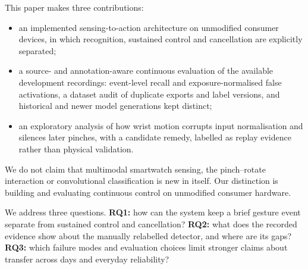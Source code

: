 This paper makes three contributions:
\begin{itemize}
\item an implemented sensing-to-action architecture on unmodified consumer devices, in which recognition, sustained control and cancellation are explicitly separated;
\item a source- and annotation-aware continuous evaluation of the available development recordings: event-level recall and exposure-normalised false activations, a dataset audit of duplicate exports and label versions, and historical and newer model generations kept distinct;
\item an exploratory analysis of how wrist motion corrupts input normalisation and silences later pinches, with a candidate remedy, labelled as replay evidence rather than physical validation.
\end{itemize}
We do not claim that multimodal smartwatch sensing, the pinch--rotate interaction or convolutional classification is new in itself. Our distinction is building and evaluating continuous control on unmodified consumer hardware.

We address three questions. \textbf{RQ1:} how can the system keep a brief gesture event separate from sustained control and cancellation? \textbf{RQ2:} what does the recorded evidence show about the manually relabelled detector, and where are its gaps? \textbf{RQ3:} which failure modes and evaluation choices limit stronger claims about transfer across days and everyday reliability?
